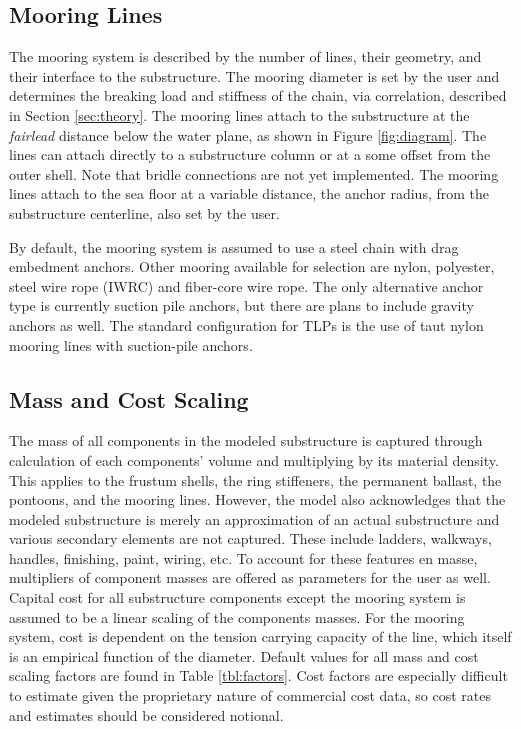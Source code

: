 \subsection{Mooring Lines}
The mooring system is described by the number of lines, their geometry,
and their interface to the substructure.  The mooring diameter is set by
the user and determines the breaking load and stiffness of the chain,
via correlation, described in Section \ref{sec:theory}.  The mooring
lines attach to the substructure at the \textit{fairlead} distance below
the water plane, as shown in Figure \ref{fig:diagram}.  The lines can
attach directly to a substructure column or at a some offset from the
outer shell.  Note that bridle connections are not yet implemented.  The
mooring lines attach to the sea floor at a variable distance, the anchor
radius, from the substructure centerline, also set by the user.

By default, the mooring system is assumed to use a steel chain with drag
embedment anchors. Other mooring available for selection are nylon,
polyester, steel wire rope (IWRC) and fiber-core wire rope.  The only
alternative anchor type is currently suction pile anchors, but there are
plans to include gravity anchors as well.  The standard configuration
for TLPs is the use of taut nylon mooring lines with suction-pile
anchors.

\subsection{Mass and Cost Scaling}
The mass of all components in the modeled substructure is captured
through calculation of each components' volume and multiplying by its material
density.  This applies to the frustum shells, the ring stiffeners, the
permanent ballast, the pontoons, and the mooring lines.
However, the model also acknowledges that the modeled substructure is
merely an approximation of an actual substructure and various secondary
elements are not captured.  These include ladders, walkways, handles,
finishing, paint, wiring, etc.  To account for these features en masse,
multipliers of component masses are offered as parameters for the user
as well.  Capital cost for all substructure components except the
mooring system is assumed to be a linear scaling of the components
masses.  For the mooring system, cost is dependent on the tension
carrying capacity of the line, which itself is an empirical function of
the diameter.  Default values for all mass and cost scaling factors are
found in Table \ref{tbl:factors}.  Cost factors are especially difficult to
estimate given the proprietary nature of commercial cost data, so
cost rates and estimates should be considered notional.

